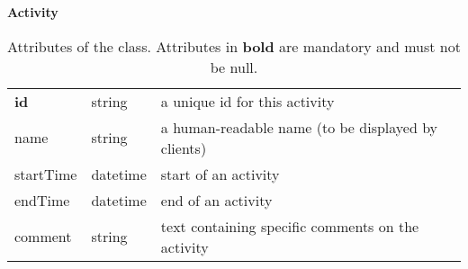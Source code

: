 \begin{table}[ht]
\small
{}\textwidth
\textbf{\normalsize Activity}\vspace{0.25em}\\
\begin{tabulary}{1.0\textwidth}{llL}
\toprule
{}  &  & \\
\midrule
\textbf{id}  & string & a unique id for this activity\\
name         & string & a human-readable name (to be displayed by clients)\\
startTime    & datetime & start of an activity\\
endTime      & datetime & end of an activity\\
comment      & string & text containing specific comments on the activity\\
\bottomrule
\end{tabulary}
\caption[Attributes of the  class.]{Attributes of the  class. Attributes in \textbf{bold} are mandatory and must not be null.}\label{tab:activity}
\end{table}


